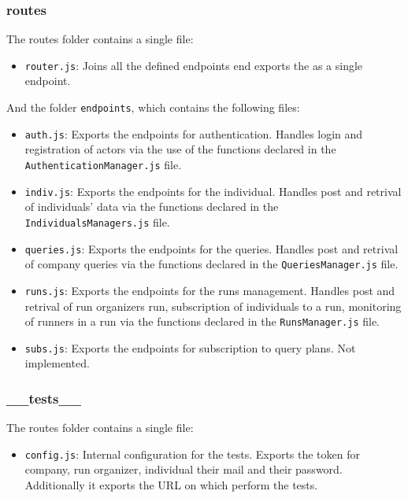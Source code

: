 \subsubsection{routes}
The routes folder contains a single file: 
\begin{itemize}
    \item \texttt{router.js}: Joins all the defined endpoints end exports the as a single endpoint.
\end{itemize}

\noindent And the folder \texttt{endpoints}, which contains the following files: 
\begin{itemize}
    \item \texttt{auth.js}: Exports the endpoints for authentication. Handles login and registration of actors via the use of the functions declared in the \texttt{AuthenticationManager.js} file.
    \item \texttt{indiv.js}: Exports the endpoints for the individual. Handles post and retrival of individuals' data via the functions declared in the \texttt{IndividualsManagers.js} file.
    \item \texttt{queries.js}: Exports the endpoints for the queries. Handles post and retrival of company queries via the functions declared in the \texttt{QueriesManager.js} file.
    \item \texttt{runs.js}: Exports the endpoints for the runs management.  Handles post and retrival of run organizers run, subscription of individuals to a run, monitoring of runners in a run via the functions declared in the \texttt{RunsManager.js} file.
    \item \texttt{subs.js}: Exports the endpoints for subscription to query plans. Not implemented.

\end{itemize}

\subsubsection{\_\_tests\_\_}
The routes folder contains a single file: 
\begin{itemize}
    \item \texttt{config.js}: Internal configuration for the tests. Exports the token for company, run organizer, individual their mail and their password. Additionally it exports the URL on which perform the tests.
\end{itemize}

